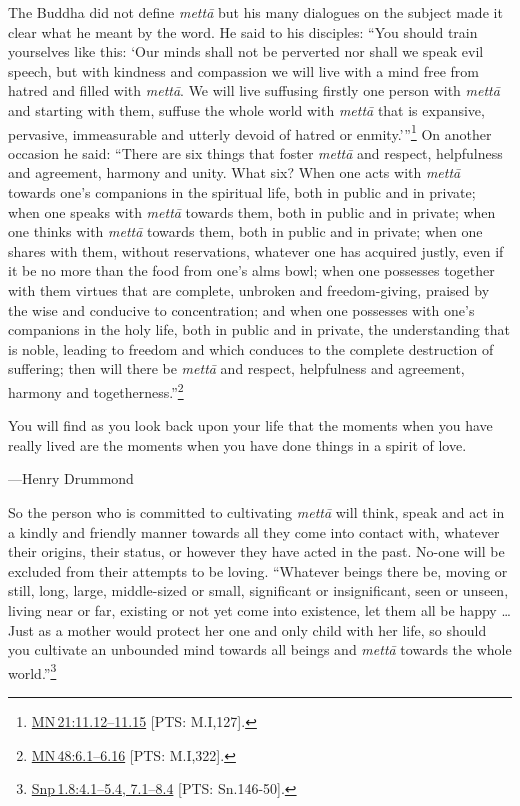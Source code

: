\documentclass[10pt, openright]{book}
\newenvironment{epigram-2}%
{%
\setstretch{1.4}
\vspace{1em}
\noindent
\quoting[leftmargin=2cm,rightmargin=2cm]%
\begin{itshape}
\large
}%
{\end{itshape}\endquoting
}%
\newenvironment{epigram-2-cite}%
{%
\quoting[leftmargin=2cm,rightmargin=2cm]%
\noindent\normal\hspace*{\fill} 
}%
{\endquoting
}%
\begin{document}
The Buddha did not define \textit{mettā} but his many dialogues on the subject made it clear what he meant by the word. He said to his disciples: “You should train yourselves like this: ‘Our minds shall not be perverted nor shall we speak evil speech, but with kindness and compassion we will live with a mind free from hatred and filled with \textit{mettā}. We will live suffusing firstly one person with \textit{mettā} and starting with them, suffuse the whole world with \textit{mettā} that is expansive, pervasive, immeasurable and utterly devoid of hatred or enmity.’”\footnote {\href{https://suttacentral.net/mn21/en/sujato\#11.12}{MN 21:11.12–11.15} [PTS: M.I,127].} On another occasion he said: “There are six things that foster \textit{mettā} and respect, helpfulness and agreement, harmony and unity. What six? When one acts with \textit{mettā} towards one’s companions in the spiritual life, both in public and in private; when one speaks with \textit{mettā} towards them, both in public and in private; when one thinks with \textit{mettā} towards them, both in public and in private; when one shares with them, without reservations, whatever one has acquired justly, even if it be no more than the food from one’s alms bowl; when one possesses together with them virtues that are complete, unbroken and freedom-giving, praised by the wise and conducive to concentration; and when one possesses with one’s companions in the holy life, both in public and in private, the understanding that is noble, leading to freedom and which conduces to the complete destruction of suffering; then will there be \textit{mettā} and respect, helpfulness and agreement, harmony and togetherness.”\footnote {\href{https://suttacentral.net/mn48/en/sujato\#6.1}{MN 48:6.1–6.16} [PTS: M.I,322].}


\begin{epigram-2}
You will find as you look back upon your life that the moments when you have really lived are the moments when you have done things in a spirit of love.
\end{epigram-2}
\begin{epigram-2-cite}
—Henry Drummond
\end{epigram-2-cite}

So the person who is committed to cultivating \textit{mettā} will think, speak and act in a kindly and friendly manner towards all they come into contact with, whatever their origins, their status, or however they have acted in the past. No-one will be excluded from their attempts to be loving. “Whatever beings there be, moving or still, long, large, middle-sized or small, significant or insignificant, seen or unseen, living near or far, existing or not yet come into existence, let them all be happy … Just as a mother would protect her one and only child with her life, so should you cultivate an unbounded mind towards all beings and \textit{mettā} towards the whole world.”\footnote {\href{https://suttacentral.net/snp1.8/en/sujato\#4.1}{Snp 1.8:4.1–5.4, 7.1–8.4} [PTS: Sn.146-50].}
\end{document}

